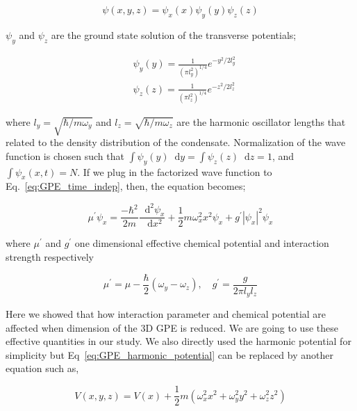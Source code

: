 \documentclass[a4paper,times,hidelinks,12pt]{article}
\newcommand*\dif{\mathop{}\!\mathrm{d}}
\begin{document}
\begin{equation}
\label{eq:GPE_time_indep_wave_func_seperated}
\psi(x, y, z) = \psi_x(x)\psi_y(y)\psi_z(z)
\end{equation}

\noindent $\psi_y$ and $\psi_z$ are the ground state solution of the transverse potentials;

\begin{equation}
\begin{split}
\label{eq:GPE_x_y_wave}
& \psi_y(y) = \frac{1}{{(\pi l_y^2)}^{1/4}}e^{-y^2/2l_y^2} \\
& \psi_z(z) = \frac{1}{{(\pi l_z^2)}^{1/4}}e^{-z^2/2l_z^2}
\end{split}
\end{equation}

\noindent where $l_y = \sqrt{\hbar/m\omega_y}$ and $l_z = \sqrt{\hbar/m\omega_z}$ are the harmonic oscillator lengths that related to the density distribution of the condensate. Normalization of the wave function is chosen such that $\int \psi_y(y) \dif y = \int \psi_z(z) \dif z = 1$, and $\int \psi_x(x, t) = N$. If we plug in the factorized wave function to Eq.~\eqref{eq:GPE_time_indep}, then, the equation becomes;

\begin{equation}
\label{eq:GPE_1D_harmonic}
\mu^{\prime}\psi_x = \frac{-\hbar^2}{2m}\frac{\dif^2\psi_x}{\dif x^2} + \frac{1}{2}m\omega_x^2 x^2\psi_x + g^{\prime}|\psi_x|^2\psi_x 
\end{equation}

\noindent where $\mu^{\prime}$ and $g^{\prime}$ one dimensional effective chemical potential and interaction strength respectively

\begin{equation}
\label{eq:GPE_1D_chem_inter}
\mu^{\prime} = \mu - \frac{\hbar}{2}(\omega_y - \omega_z), \quad g^{\prime} = \frac{g}{2\pi l_y l_z}
\end{equation}

\noindent Here we showed that how interaction parameter and chemical potential are affected when dimension of the 3D GPE is reduced. We are going to use these effective quantities in our study. We also directly used the harmonic potential for simplicity but Eq~\eqref{eq:GPE_harmonic_potential} can be replaced by another equation such as,

\begin{equation}
\label{eq:GPE_harmonic_potential_plus_pot}
V(x, y, z) = V(x) + \frac{1}{2}m(\omega_x^2 x^2 + \omega_y^2y^2 + \omega_z^2z^2)
\end{equation}
\end{document}
